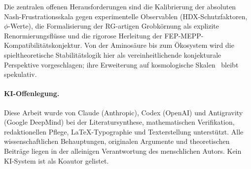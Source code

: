 \documentclass[12pt,a4paper]{article}
\theoremstyle{remark}
\begin{document}
Die zentralen offenen Herausforderungen sind die Kalibrierung der absoluten Nash-Frustrationsskala gegen experimentelle Observablen (HDX-Schutzfaktoren, $\phi$-Werte), die Formalisierung der RG-artigen Grobkörnung als explizite Renormierungsflüsse und die rigorose Herleitung der FEP-MEPP-Kompatibilitätskonjektur. Von der Aminosäure bis zum Ökosystem wird die spieltheoretische Stabilitätslogik hier als vereinheitlichende konjekturale Perspektive vorgeschlagen; ihre Erweiterung auf kosmologische Skalen~\citep{FST-Unified2026} bleibt spekulativ.

\begingroup
\small
\paragraph*{KI-Offenlegung.} Diese Arbeit wurde von Claude (Anthropic), Codex (OpenAI) und Antigravity (Google DeepMind) bei der Literatursynthese, mathematischen Verifikation, redaktionellen Pflege, LaTeX-Typographie und Texterstellung unterstützt. Alle wissenschaftlichen Behauptungen, originalen Argumente und theoretischen Beiträge liegen in der alleinigen Verantwortung des menschlichen Autors. Kein KI-System ist als Koautor gelistet.
\endgroup

\end{document}
